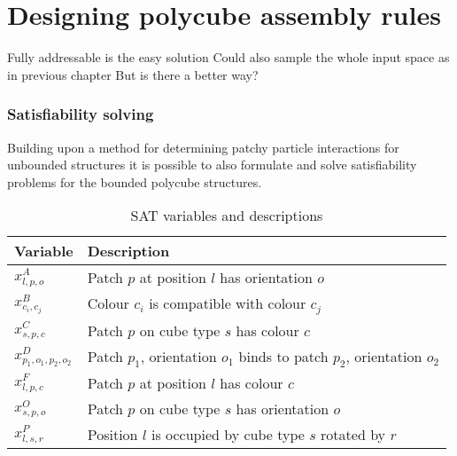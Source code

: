 \chapter{Designing polycube assembly rules}

Fully addressable is the easy solution
Could also sample the whole input space as in previous chapter
But is there a better way?

\subsection{Satisfiability solving}

Building upon a method for determining patchy particle interactions for unbounded structures \cite{romano2020designing} it is possible to also formulate and solve satisfiability problems for the bounded polycube structures.

\begin{table}[h!]
\centering
\begin{tabular}{l|l} 
 \hline
 Variable & Description \\ [0.5ex] 
 \hline
 \hline
 
\(x_{l,p,o}^{A}\) & Patch \(p\) at position \(l\) has orientation \(o\) \\
\(x_{c_i,c_j}^{B}\) &  Colour \(c_i\) is compatible with colour \(c_j\) \\
\(x_{s,p,c}^{C}\) & Patch \(p\) on cube type \(s\) has colour \(c\) \\
\(x_{p_1,o_1,p_2,o_2}^{D}\) & Patch \(p_1\), orientation \(o_1\) binds to patch \(p_2\), orientation \(o_2\) \\
\(x_{l,p,c}^{F}\) & Patch \(p\) at position \(l\) has colour \(c\) \\
\(x_{s,p,o}^{O}\) & Patch \(p\) on cube type \(s\) has orientation \(o\) \\
\(x_{l,s,r}^{P}\) & Position \(l\) is occupied by cube type \(s\) rotated by \(r\) \\
 \hline
\end{tabular}
\caption{SAT variables and descriptions}
\label{tab:sat_variables}
\end{table}


